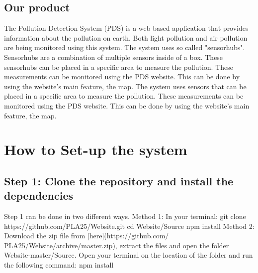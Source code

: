 \documentclass[a4paper]{article}
\begin{document}
\subsection{Our product}
The Pollution Detection System (PDS) is a web-based application that provides information about the pollution on earth. Both light pollution and air pollution are being monitored using this system.
\newline
\newline
The system uses so called "sensorhubs". Sensorhubs are a combination of multiple sensors inside of a box. These sensorhubs can be placed in a specific area to measure the pollution. These measurements can be monitored using the PDS website. This can be done by using the website's main feature, the map.
\newline
\newline
The system uses sensors that can be placed in a specific area to measure the pollution. These measurements can be monitored using the PDS website. This can be done by using the website's main feature, the map.

\newpage

\section{How to Set-up the system}

\subsection{Step 1: Clone the repository and install the dependencies}
Step 1 can be done in two different ways.
\newline
\newline
Method 1:
\newline
In your terminal:
\newline
git clone https://github.com/PLA25/Website.git
\newline
cd Website/Source
\newline
npm install
\newline
\newline
Method 2:
\newline
Download the zip file from [here](https://github.com/
\newline
PLA25/Website/archive/master.zip), extract the files and open the folder Website-master/Source.
\newline
Open your terminal on the location of the folder and run the following command:
\newline
npm install
\newline
\end{document}
